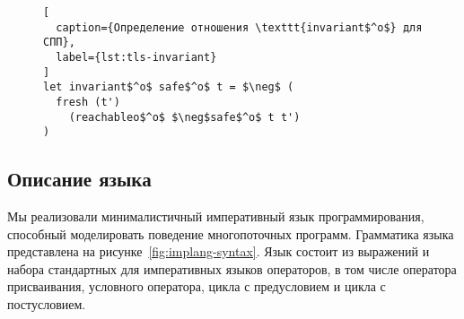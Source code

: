 \begin{figure}[thb]
\begin{minipage}{\linewidth}
\begin{lstlisting}[
  caption={Определение отношения \texttt{invariant$^o$} для СПП},
  label={lst:tls-invariant}
]
let invariant$^o$ safe$^o$ t = $\neg$ (
  fresh (t')
    (reachableo$^o$ $\neg$safe$^o$ t t')
)
\end{lstlisting}
\end{minipage}
\end{figure}

\subsection{Описание языка}

Мы реализовали минималистичный императивный язык программирования, 
способный моделировать поведение многопоточных программ.
Грамматика языка представлена на рисунке~\ref{fig:implang-syntax}.
Язык состоит из выражений и набора стандартных для 
императивных языков операторов, 
в том числе оператора присваивания, условного оператора,
цикла с предусловием и цикла с постусловием.

